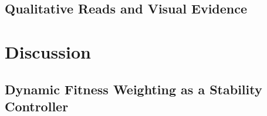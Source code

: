 \documentclass[letterpaper]{article} %
\begin{document}
\subsection{Qualitative Reads and Visual Evidence}


\section{Discussion}

\subsection{Dynamic Fitness Weighting as a Stability Controller}
\end{document}
